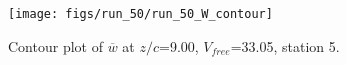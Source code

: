 \begin{figure}[H]
\centering
\texttt{[image: figs/run\_50/run\_50\_W\_contour]}
\caption{Contour plot of $\overline{w}$ at $z/c$=9.00, $V_{free}$=33.05, station 5.}
\label{fig:run_50_W_contour}
\end{figure}


